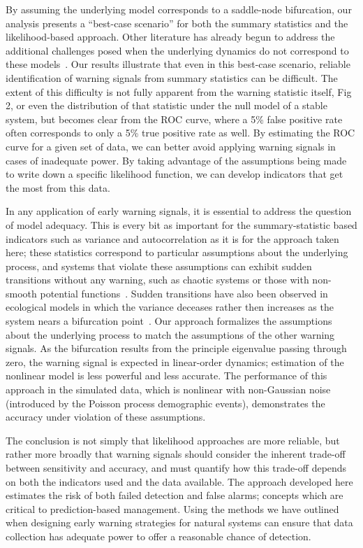 \documentclass[authoryear,preprint,11pt]{elsarticle}
\begin{document}
By assuming the underlying model corresponds to a saddle-node bifurcation,
our analysis presents a ``best-case scenario'' for both the summary statistics and the likelihood-based approach. 
Other literature has already begun to address the additional challenges posed when the underlying 
dynamics do not correspond to these models~\citep{Hastings2010}.
Our results illustrate that even in this best-case scenario, 
reliable identification of warning signals from summary statistics can be difficult.  
The extent of this difficulty is not fully apparent from the warning statistic itself, Fig 2,
or even the distribution of that statistic under the null model of a stable system, 
but becomes clear from the ROC curve, where a 5\% false positive rate often corresponds to only a 5\% true positive rate as well.  
By estimating the ROC curve for a given set of data, 
we can better avoid applying warning signals in cases of inadequate power.
By taking advantage of the assumptions being made to write down a specific likelihood function,
we can develop indicators that get the most from this data.  


In any application of early warning signals, it is essential to address the question of model adequacy.  
This is every bit as important for the summary-statistic based indicators such as variance and autocorrelation
as it is for the approach taken here; these statistics correspond to particular assumptions about the underlying process,
and systems that violate these assumptions can exhibit sudden transitions without any warning,
such as chaotic systems or those with non-smooth potential functions~\citep{Hastings2010}.
Sudden transitions have also been observed in ecological models in which 
the variance deceases rather then increases as the system nears a bifurcation point~\citep{Schreiber2003, Schreiber2008, Dakos2011a}.  
Our approach formalizes the assumptions about the underlying process to match the assumptions of the other warning signals.  
As the bifurcation results from the principle eigenvalue passing through zero, 
the warning signal is expected in linear-order dynamics;
estimation of the nonlinear model is less powerful and less accurate.  
The performance of this approach in the simulated data, which is nonlinear with non-Gaussian noise 
(introduced by the Poisson process demographic events), 
demonstrates the accuracy under violation of these assumptions.  


The conclusion is not simply that likelihood approaches are more reliable, 
but rather more broadly that warning signals should consider
the inherent trade-off between sensitivity and accuracy,
and must quantify how this trade-off depends on both the indicators used and the data available.  
The approach developed here estimates the risk of both failed detection and false alarms;
concepts which are critical to prediction-based management.  
Using the methods we have outlined when designing early warning strategies for natural systems
can ensure that data collection has adequate power to offer a reasonable chance of detection. 
\end{document}
